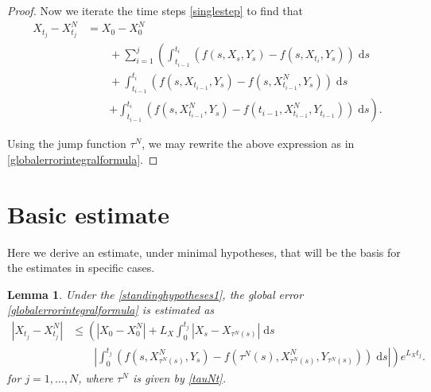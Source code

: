 \documentclass[reqno,12pt]{amsart}
\theoremstyle{plain}%
\newtheorem{lem}{Lemma}[section]
\theoremstyle{definition}
\begin{document}
\begin{proof}
    Now we iterate the time steps \eqref{singlestep} to find that
    \begin{align*}
        X_{t_j} - X_{t_j}^N & = X_0 - X_0^N \\
        & \qquad + \sum_{i=1}^{j} \left(\int_{t_{i-1}}^{t_i} \left( f(s, X_s, Y_s) - f(s, X_{t_{i}}, Y_s) \right)\;\mathrm{d}s \right. \\ 
        & \qquad + \int_{t_{i-1}}^{t_i} \left( f(s, X_{t_{i-1}}, Y_s) - f(s, X_{t_{i-1}}^N, Y_s) \right)\;\mathrm{d}s \\
        & \qquad \left. + \int_{t_{i-1}}^{t_i} \left( f(s, X_{t_{i-1}}^N, Y_s) - f(t_{i-1}, X_{t_{i-1}}^N, Y_{t_{i-1}}) \right)\;\mathrm{d}s \right).
    \end{align*}

    Using the jump function $\tau^N$, we may rewrite the above expression as in \eqref{globalerrorintegralformula}.
\end{proof}

\section{Basic estimate}

Here we derive an estimate, under minimal hypotheses, that will be the basis for the estimates in specific cases.

\begin{lem}
    \label{lembasicestimate}
    Under the \cref{standinghypotheses1}, the global error \eqref{globalerrorintegralformula} is estimated as
    \begin{equation}
        \label{Etjbasicbound}
        \begin{aligned}
            |X_{t_j} - X_{t_j}^N| & \leq \left( |X_0 - X_0^N| + L_X \int_0^{t_j} |X_s - X_{\tau^N(s)}| \;\mathrm{d}s \right. \\
            & \qquad \left. \left|\int_0^{t_j} \left( f(s, X_{\tau^N(s)}^N, Y_s) - f(\tau^N(s), X_{\tau^N(s)}^N, Y_{\tau^N(s)}) \right)\;\mathrm{d}s\right|\right) e^{L_X t_j}.
        \end{aligned}
    \end{equation}
    for $j=1, \ldots, N$, where $\tau^N$ is given by \eqref{tauNt}.
\end{lem}
\end{document}
